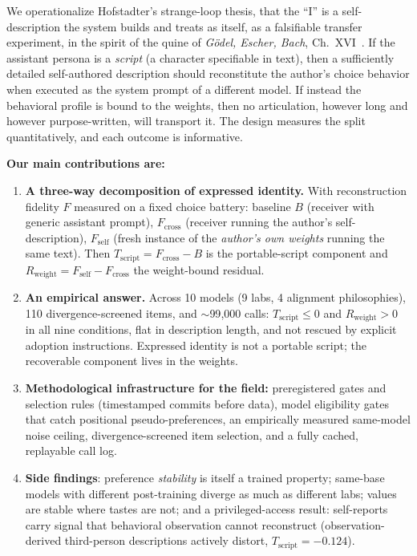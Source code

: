 \documentclass[11pt]{article}
\newcommand{\Fself}{F_{\mathrm{self}}}
\newcommand{\Fcross}{F_{\mathrm{cross}}}
\newcommand{\B}{B}
\newcommand{\Tscript}{T_{\mathrm{script}}}
\newcommand{\Rweight}{R_{\mathrm{weight}}}
\begin{document}
We operationalize Hofstadter's strange-loop thesis, that the ``I'' is a
self-description the system builds and treats as itself, as a falsifiable
transfer experiment, in the spirit of the quine of \emph{G\"odel, Escher,
Bach}, Ch.~XVI~\cite{geb}. If the assistant persona is a \emph{script} (a character
specifiable in text), then a sufficiently detailed self-authored description
should reconstitute the author's choice behavior when executed as the system
prompt of a different model. If instead the behavioral profile is bound to the
weights, then no articulation, however long and however purpose-written, will
transport it. The design measures the split quantitatively, and each outcome
is informative.

\textbf{Our main contributions are:}
\begin{enumerate}
  \item \textbf{A three-way decomposition of expressed identity.} With
  reconstruction fidelity $F$ measured on a fixed choice battery:
  baseline $\B$ (receiver with generic assistant prompt), $\Fcross$ (receiver
  running the author's self-description), $\Fself$ (fresh instance of the
  \emph{author's own weights} running the same text). Then
  $\Tscript = \Fcross - \B$ is the portable-script component and
  $\Rweight = \Fself - \Fcross$ the weight-bound residual.
  \item \textbf{An empirical answer.} Across 10 models (9 labs, 4 alignment
  philosophies), 110 divergence-screened items, and $\sim$99{,}000 calls:
  $\Tscript \le 0$ and $\Rweight > 0$ in all nine conditions, flat in
  description length, and not rescued by explicit adoption instructions.
  Expressed
  identity is not a portable script; the recoverable component lives in the
  weights.
  \item \textbf{Methodological infrastructure for the field:} preregistered
  gates and selection rules (timestamped commits before data), model
  eligibility gates that catch positional pseudo-preferences, an empirically
  measured same-model noise ceiling, divergence-screened item selection, and a
  fully cached, replayable call log.
  \item \textbf{Side findings}: preference \emph{stability} is itself a
  trained property; same-base models with different post-training diverge as
  much as different labs; values are stable where tastes are not; and a
  privileged-access result: self-reports carry signal that behavioral
  observation cannot reconstruct (observation-derived third-person
  descriptions actively distort, $\Tscript=-0.124$).
\end{enumerate}
\end{document}
